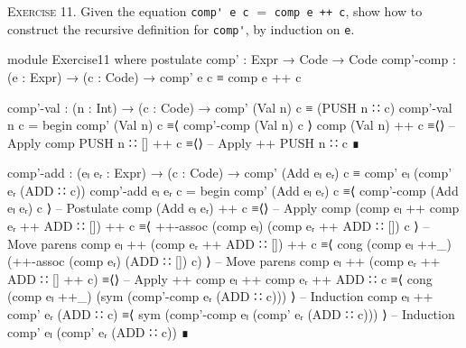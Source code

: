 \documentclass{article}
\begin{document}
\noindent
\textsc{Exercise 11.} Given the equation \verb!comp' e c! $=$ \verb!comp e ++ c!, show how to construct the recursive definition for \verb!comp'!, by induction on \texttt{e}.

\begin{code}
module Exercise11 where
  postulate
    comp' : Expr → Code → Code
    comp'-comp : (e : Expr) → (c : Code) → comp' e c ≡ comp e ++ c
\end{code}
\begin{code}
  comp'-val : (n : Int) → (c : Code) → comp' (Val n) c ≡ (PUSH n ∷ c)
  comp'-val n c =
    begin
      comp' (Val n) c
    ≡⟨ comp'-comp (Val n) c ⟩
      comp (Val n) ++ c
    ≡⟨⟩ -- Apply comp
      PUSH n ∷ [] ++ c
    ≡⟨⟩ -- Apply ++
      PUSH n ∷ c
    ∎
\end{code}
\begin{code}
  comp'-add : (eₗ eᵣ : Expr) → (c : Code)
    → comp' (Add eₗ eᵣ) c ≡ comp' eₗ (comp' eᵣ (ADD ∷ c))
  comp'-add eₗ eᵣ c =
    begin
      comp' (Add eₗ eᵣ) c
    ≡⟨ comp'-comp (Add eₗ eᵣ) c ⟩ -- Postulate
      comp (Add eₗ eᵣ) ++ c
    ≡⟨⟩ -- Apply comp
      (comp eₗ ++ comp eᵣ ++ ADD ∷ []) ++ c
    ≡⟨ ++-assoc (comp eₗ) (comp eᵣ ++ ADD ∷ []) c ⟩ -- Move parens
      comp eₗ ++ (comp eᵣ ++ ADD ∷ []) ++ c
    ≡⟨ cong (comp eₗ ++_) (++-assoc (comp eᵣ) (ADD ∷ []) c) ⟩ -- Move parens
      comp eₗ ++ (comp eᵣ ++ ADD ∷ [] ++ c)
    ≡⟨⟩ -- Apply ++
      comp eₗ ++ comp eᵣ ++ ADD ∷ c
    ≡⟨ cong (comp eₗ ++_) (sym (comp'-comp eᵣ (ADD ∷ c))) ⟩ -- Induction
      comp eₗ ++ comp' eᵣ (ADD ∷ c)
    ≡⟨ sym (comp'-comp eₗ (comp' eᵣ (ADD ∷ c))) ⟩ -- Induction
      comp' eₗ (comp' eᵣ (ADD ∷ c))
    ∎
\end{code}
\end{document}
